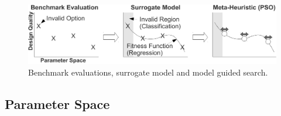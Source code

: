 \documentclass[runningheads,a4paper]{llncs}
\begin{document}


  \begin{figure}
     \centering
\includegraphics[width=1.0\textwidth]{./figs/surrogate_tobias.pdf}
        \caption{Benchmark evaluations, surrogate model and model guided search.}     
           \label{fig:ouridea}
  \end{figure}
 

\subsection{Parameter Space} 
\label{designspace}
\end{document}
